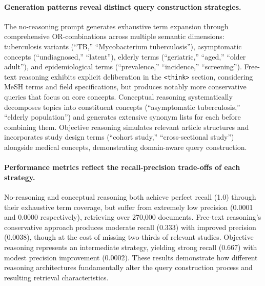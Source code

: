 \paragraph{Generation patterns reveal distinct query construction strategies.} The no-reasoning prompt generates exhaustive term expansion through comprehensive OR-combinations across multiple semantic dimensions: tuberculosis variants (``TB,'' ``Mycobacterium tuberculosis''), asymptomatic concepts (``undiagnosed,'' ``latent''), elderly terms (``geriatric,'' ``aged,'' ``older adult''), and epidemiological terms (``prevalence,'' ``incidence,'' ``screening''). Free-text reasoning exhibits explicit deliberation in the \texttt{<think>} section, considering MeSH terms and field specifications, but produces notably more conservative queries that focus on core concepts. Conceptual reasoning systematically decomposes topics into constituent concepts (``asymptomatic tuberculosis,'' ``elderly population'') and generates extensive synonym lists for each before combining them. Objective reasoning simulates relevant article structures and incorporates study design terms (``cohort study,'' ``cross-sectional study'') alongside medical concepts, demonstrating domain-aware query construction.

\paragraph{Performance metrics reflect the recall-precision trade-offs of each strategy.} No-reasoning and conceptual reasoning both achieve perfect recall (1.0) through their exhaustive term coverage, but suffer from extremely low precision (0.0001 and 0.0000 respectively), retrieving over 270,000 documents. Free-text reasoning's conservative approach produces moderate recall (0.333) with improved precision (0.0038), though at the cost of missing two-thirds of relevant studies. Objective reasoning represents an intermediate strategy, yielding strong recall (0.667) with modest precision improvement (0.0002). These results demonstrate how different reasoning architectures fundamentally alter the query construction process and resulting retrieval characteristics.

\clearpage




